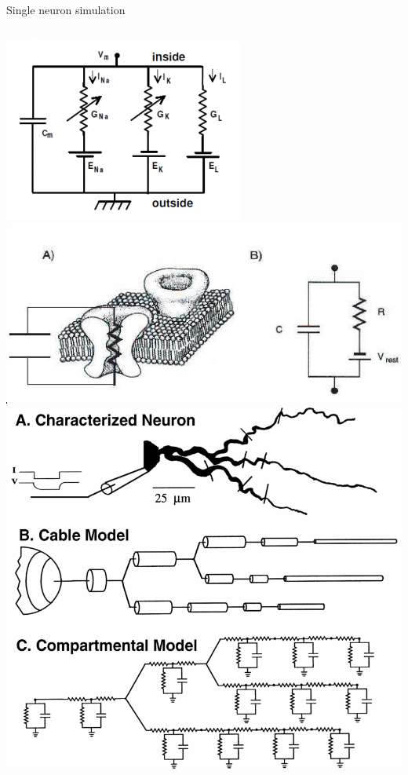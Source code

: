 \documentclass[handout,aspectratio=169]{beamer}
\begin{document}
\begin{frame}{Single neuron simulation}
	\centering
	\begin{columns}
		\includegraphics[width=\textwidth]{media/hh-circuit.png}\\
		\includegraphics[width=\textwidth]{media/hh-circuit2.jpg}
		\includegraphics[width=\textwidth]{media/hh-circuit3.png}
	\end{columns}
\end{frame}
\end{document}

